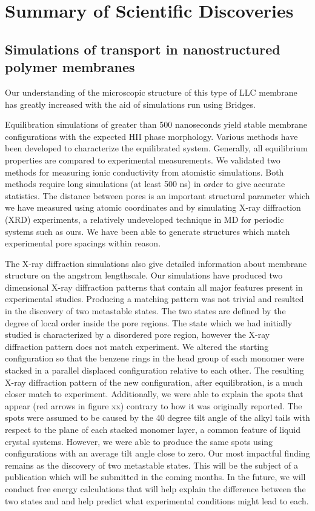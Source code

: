 \section*{Summary of Scientific Discoveries}

\subsection*{Simulations of transport in nanostructured polymer membranes}
Our understanding of the microscopic structure of this type of LLC
membrane has greatly increased with the aid of simulations run using
Bridges. 

Equilibration simulations of greater than 500 nanoseconds yield
stable membrane configurations with the expected HII phase 
morphology. Various methods have been developed to characterize
the equilibrated system. Generally, all equilibrium properties are
compared to experimental measurements. We validated two methods
for measuring ionic conductivity from atomistic simulations. Both 
methods require long simulations (at least 500 ns) in order to give
accurate statistics. The distance between pores is an important
structural parameter which we have measured using atomic coordinates
and by simulating X-ray diffraction (XRD) experiments, a relatively
undeveloped technique in MD for periodic systems such as ours. We 
have been able to generate structures which match experimental pore
spacings within reason.

The X-ray diffraction simulations also give detailed information
about membrane structure on the angstrom lengthscale. Our simulations
have produced two dimensional X-ray diffraction patterns that 
contain all major features present in experimental studies. Producing
a matching pattern was not trivial and resulted in the discovery of
two metastable states. The two states are defined by the degree of 
local order inside the pore regions. The state which we had initially
studied is characterized by a disordered pore region, however the X-ray
diffraction pattern does not match experiment. We altered the starting 
configuration so that the benzene rings in the head group of each
monomer were stacked in a parallel displaced configuration relative
to each other. The resulting X-ray diffraction pattern of the new
configuration, after equilibration, is a much closer match to experiment.
Additionally, we were able to explain the spots that appear (red arrows
in figure xx) contrary to how it was originally reported. The spots 
were assumed to be caused by the 40 degree tilt angle of the alkyl
tails with respect to the plane of each stacked monomer layer, a 
common feature of liquid crystal systems. However, we were able to 
produce the same spots using configurations with an average tilt angle
close to zero. Our most impactful finding remains as the discovery of 
two metastable states. This will be the subject of a publication which 
will be submitted in the coming months. In the future, we will conduct
free energy calculations that will help explain the difference between
the two states and and help predict what experimental conditions might
lead to each. 

